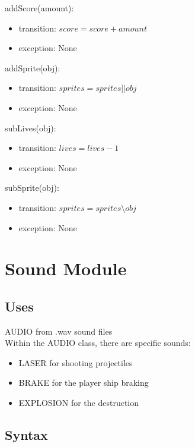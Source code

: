 \documentclass[12pt]{article}
\begin{document}
\noindent addScore(amount):
\begin{itemize}
    \item transition: $ score = score + amount $
    \item exception: None
\end{itemize}

\noindent addSprite(obj):
\begin{itemize}
    \item transition: $ sprites = sprites || obj $
    \item exception: None
\end{itemize}

\noindent subLives(obj):
\begin{itemize}
    \item transition: $ lives = lives - 1 $
    \item exception: None
\end{itemize}

\noindent subSprite(obj):
\begin{itemize}
    \item transition: $ sprites = sprites \setminus obj $
    \item exception: None
\end{itemize}

\newpage

\section*{Sound Module}

\subsection*{Uses}

AUDIO from .wav sound files\\
Within the AUDIO class, there are specific sounds:\\
\begin{itemize}
  \item LASER for shooting projectiles\\
  \item BRAKE for the player ship braking\\
  \item EXPLOSION for the destruction\\
\end{itemize}

\subsection*{Syntax}
\end{document}

